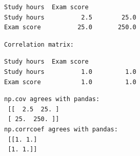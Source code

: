 \documentclass[11pt]{article}
\begin{document}
    
    \begin{Verbatim}[commandchars=\\\{\}]
             Study hours  Exam score
Study hours          2.5        25.0
Exam score          25.0       250.0
    \end{Verbatim}

    
    \begin{Verbatim}[commandchars=\\\{\}]
Correlation matrix:
    \end{Verbatim}

    
    \begin{Verbatim}[commandchars=\\\{\}]
             Study hours  Exam score
Study hours          1.0         1.0
Exam score           1.0         1.0
    \end{Verbatim}

    
    \begin{Verbatim}[commandchars=\\\{\}]
np.cov agrees with pandas:
 [[  2.5  25. ]
 [ 25.  250. ]]
np.corrcoef agrees with pandas:
 [[1. 1.]
 [1. 1.]]
    \end{Verbatim}
\end{document}
